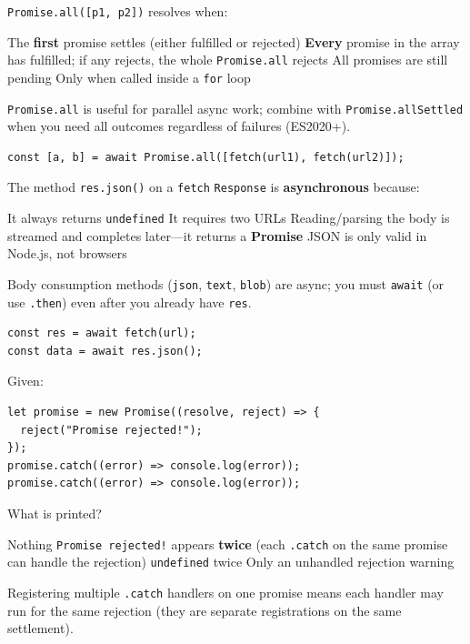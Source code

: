 \newpage

\question[4]
\texttt{Promise.all([p1, p2])} resolves when:
\begin{choices}
  \choice The \textbf{first} promise settles (either fulfilled or rejected)
  \CorrectChoice \textbf{Every} promise in the array has fulfilled; if any rejects, the whole \texttt{Promise.all} rejects
  \choice All promises are still pending
  \choice Only when called inside a \texttt{for} loop
\end{choices}
\begin{solution}
  \texttt{Promise.all} is useful for parallel async work; combine with \texttt{Promise.allSettled} when you need all outcomes regardless of failures (ES2020+).
\begin{lstlisting}[style=js]
const [a, b] = await Promise.all([fetch(url1), fetch(url2)]);
\end{lstlisting}
\end{solution}

\question[4]
The method \texttt{res.json()} on a \texttt{fetch} \texttt{Response} is \textbf{asynchronous} because:
\begin{choices}
  \choice It always returns \texttt{undefined}
  \choice It requires two URLs
  \CorrectChoice Reading/parsing the body is streamed and completes later---it returns a \textbf{Promise}
  \choice JSON is only valid in Node.js, not browsers
\end{choices}
\begin{solution}
  Body consumption methods (\texttt{json}, \texttt{text}, \texttt{blob}) are async; you must \texttt{await} (or use \texttt{.then}) even after you already have \texttt{res}.
\begin{lstlisting}[style=js]
const res = await fetch(url);
const data = await res.json();
\end{lstlisting}
\end{solution}

\question[4]
Given:
\begin{lstlisting}[style=js]
let promise = new Promise((resolve, reject) => {
  reject("Promise rejected!");
});
promise.catch((error) => console.log(error));
promise.catch((error) => console.log(error));
\end{lstlisting}
What is printed?
\begin{choices}
  \choice Nothing
  \CorrectChoice \texttt{Promise rejected!} appears \textbf{twice} (each \texttt{.catch} on the same promise can handle the rejection)
  \choice \texttt{undefined} twice
  \choice Only an unhandled rejection warning
\end{choices}
\begin{solution}
  Registering multiple \texttt{.catch} handlers on one promise means each handler may run for the same rejection (they are separate registrations on the same settlement).
\end{solution}

